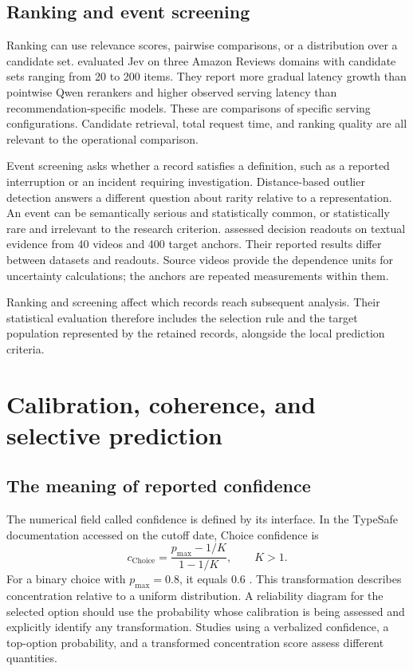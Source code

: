 \documentclass[11pt,a4paper]{article}
\begin{document}
\subsection{Ranking and event screening}

Ranking can use relevance scores, pairwise comparisons, or a distribution over a candidate set. \citet{lyu2026} evaluated Jev on three Amazon Reviews domains with candidate sets ranging from 20 to 200 items. They report more gradual latency growth than pointwise Qwen rerankers and higher observed serving latency than recommendation-specific models. These are comparisons of specific serving configurations. Candidate retrieval, total request time, and ranking quality are all relevant to the operational comparison.

Event screening asks whether a record satisfies a definition, such as a reported interruption or an incident requiring investigation. Distance-based outlier detection answers a different question about rarity relative to a representation. An event can be semantically serious and statistically common, or statistically rare and irrelevant to the research criterion. \citet{qin2026} assessed decision readouts on textual evidence from 40 videos and 400 target anchors. Their reported results differ between datasets and readouts. Source videos provide the dependence units for uncertainty calculations; the anchors are repeated measurements within them.

Ranking and screening affect which records reach subsequent analysis. Their statistical evaluation therefore includes the selection rule and the target population represented by the retained records, alongside the local prediction criteria.

\section{Calibration, coherence, and selective prediction}\label{sec:reliability}

\subsection{The meaning of reported confidence}

The numerical field called confidence is defined by its interface. In the TypeSafe documentation accessed on the cutoff date, Choice confidence is
\begin{equation}
 c_{\mathrm{Choice}}=
 \frac{p_{\max}-1/K}{1-1/K},\qquad K>1.
 \label{eq:confidence}
\end{equation}
For a binary choice with $p_{\max}=0.8$, it equals 0.6 \citep{typesafe-confidence}. This transformation describes concentration relative to a uniform distribution. A reliability diagram for the selected option should use the probability whose calibration is being assessed and explicitly identify any transformation. Studies using a verbalized confidence, a top-option probability, and a transformed concentration score assess different quantities.
\end{document}
